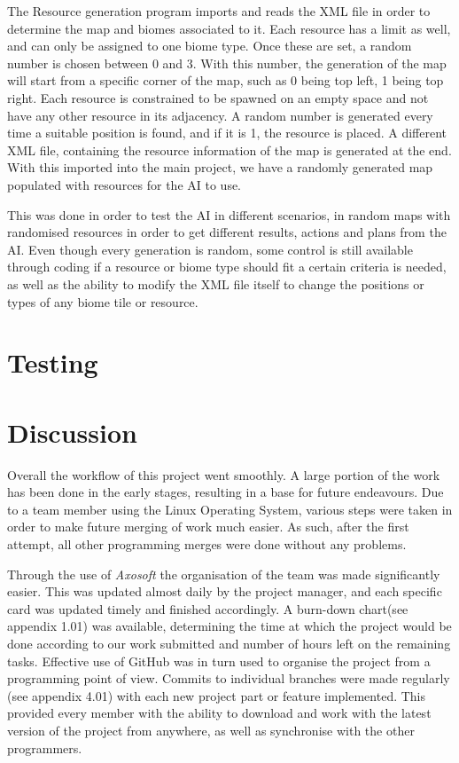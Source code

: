 \documentclass[a4paper]{report}
\begin{document}
The Resource generation program imports and reads the XML file in order to determine the map and biomes associated to it. Each resource has a limit as well, and can only be assigned to one biome type. Once these are set, a random number is chosen between 0 and 3. With this number, the generation of the map will start from a specific corner of the map, such as 0 being top left, 1 being top right. Each resource is constrained to be spawned on an empty space and not have any other resource in its adjacency. A random number is generated every time a suitable position is found, and if it is 1, the resource is placed. A different XML file, containing the resource information of the map is generated at the end. With this imported into the main project, we have a randomly generated map populated with resources for the AI to use.

This was done in order to test the AI in different scenarios, in random maps with randomised resources in order to get different results, actions and plans from the AI. Even though every generation is random, some control is still available through coding if a resource or biome type should fit a certain criteria is needed, as well as the ability to modify the XML file itself to change the positions or types of any biome tile or resource.

\chapter{Testing}
\chapter{Discussion}
Overall the workflow of this project went smoothly. A large portion of the work has been done in the early stages, resulting in a base for future endeavours. Due to a team member using the Linux Operating System, various steps were taken in order to make future merging of work much easier. As such, after the first attempt, all other programming merges were done without any problems. 

Through the use of \textit{Axosoft} the organisation of the team was made significantly easier. This was updated almost daily by the project manager, and each specific card was updated timely and finished accordingly. A burn-down chart(see appendix 1.01) was available, determining the time at which the project would be done according to our work submitted and number of hours left on the remaining tasks. Effective use of GitHub was in turn used to organise the project from a programming point of view. Commits to individual branches were made regularly (see appendix 4.01) with each new project part or feature implemented. This provided every member with the ability to download and work with the latest version of the project from anywhere, as well as synchronise with the other programmers.
\end{document}
